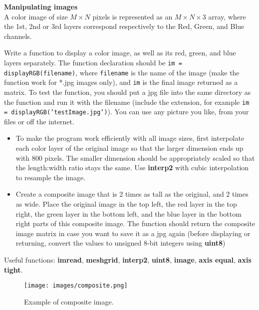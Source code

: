 \documentclass[12pt]{TDTP}
\begin{document}
\newpage
\Exo
\textbf{Manipulating images}\\
A color image of size $M\times N$ pixels is represented as an $M\times N \times 3$ array, where the 1st, 2nd or 3rd layers correspond respectively to the Red, Green, and Blue channels.

Write a function to display a color image, as well as its red, green, and blue layers separately. 
The function declaration should be \texttt{im = displayRGB(filename)}, where \texttt{filename} is the name of the image (make the function work for *.jpg images only), and  \texttt{im} is the final image returned as a matrix.
To test the function, you should put a jpg file into the same directory as the function and run it with the filename (include the extension, for example \texttt{im = displayRGB('testImage.jpg')}).
You can use any picture you like, from your files or off the internet. 
\begin{itemize}
\item To make the program work efficiently with all image sizes, first interpolate each color layer of the original image so that the larger dimension ends up with 800 pixels. The smaller dimension should be appropriately scaled so that the length:width ratio stays the same. 
Use \textbf{interp2} with cubic interpolation to resample the image.

\item Create a composite image that is 2 times as tall as the original, and 2 times as wide. 
Place the original image in the top left, the red layer in the top right, the green layer in the bottom left, and the blue layer in the bottom right parts of this composite image. 
The function should return the composite image matrix in case you want to save it as a jpg again (before displaying or returning, convert the values to unsigned 8-bit integers using \textbf{uint8})
\end{itemize}

Useful functions: \textbf{imread}, \textbf{meshgrid}, \textbf{interp2}, \textbf{uint8}, \textbf{image}, \textbf{axis equal}, \textbf{axis tight}.

\begin{figure}[h!]
\begin{center}
\texttt{[image: images/composite.png]}
\caption{Example of composite image.}
\end{center}
\end{figure}
\end{document}
